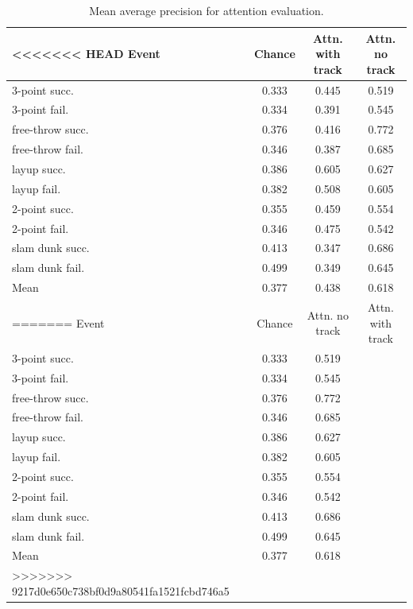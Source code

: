 \begin{table}[ht!]
\begin{center}
\small
 \begin{tabular}{|l|c|c|c|}
  \hline
<<<<<<< HEAD
Event            & Chance & Attn. with track & Attn. no track \\ \hline \hline
3-point succ.    & 0.333 & 0.445 & 0.519 \\ 
3-point fail.    & 0.334 & 0.391 & 0.545 \\ 
free-throw succ. & 0.376 & 0.416 & 0.772 \\ 
free-throw fail. & 0.346 & 0.387 & 0.685 \\  
layup succ.      & 0.386 & 0.605 & 0.627 \\ 
layup fail.      & 0.382 & 0.508 & 0.605 \\ 
2-point succ.    & 0.355 & 0.459 & 0.554 \\ 
2-point fail.    & 0.346 & 0.475 & 0.542 \\ 
slam dunk succ.  & 0.413 & 0.347 & 0.686 \\ 
slam dunk fail.  & 0.499 & 0.349 & 0.645 \\ \hline \hline  
Mean             & 0.377 & 0.438 & 0.618 \\ \hline
=======
Event            & Chance & Attn. no track & Attn. with track \\ \hline \hline
3-point succ.    & 0.333 & 0.519 & \\ 
3-point fail.    & 0.334 & 0.545 & \\ 
free-throw succ. & 0.376 & 0.772 & \\ 
free-throw fail. & 0.346 & 0.685 &  \\  
layup succ.      & 0.386 & 0.627 & \\ 
layup fail.      & 0.382 & 0.605 &\\ 
2-point succ.    & 0.355 & 0.554 &\\ 
2-point fail.    & 0.346 & 0.542 &\\ 
slam dunk succ.  & 0.413 &  0.686 &\\ 
slam dunk fail.  & 0.499 & 0.645 & \\ \hline \hline  
Mean             & 0.377 & 0.618 & \\ \hline
>>>>>>> 9217d0e650c738bf0d9a80541fa1521fcbd746a5
  \end{tabular}
\end{center}
  \caption{Mean average precision for attention evaluation.}
  \label{tab:attention_res}
\end{table}

